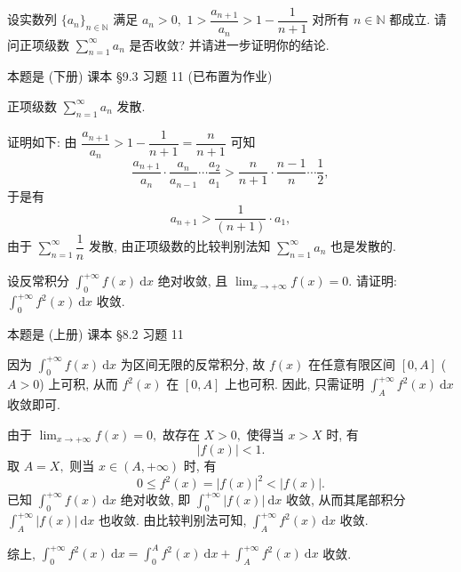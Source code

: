 \begin{question}[points = 10]
设实数列 $\{a_n\}_{n\in\mathbb{N}}$ 满足 $a_n > 0,$ $1 > \dfrac{a_{n+1}}{a_n} > 1 - \dfrac{1}{n+1}$ 对所有 $n \in \mathbb{N}$ 都成立. 请问正项级数 $\displaystyle \sum_{n=1}^{\infty} a_n$ 是否收敛? 并请进一步证明你的结论.

\end{question}

\begin{solution}
本题是 (下册) 课本 \S 9.3 习题 11 (已布置为作业)

正项级数 $\displaystyle \sum_{n=1}^{\infty} a_n$ 发散.

证明如下: 由 $\dfrac{a_{n+1}}{a_n} > 1 - \dfrac{1}{n+1} = \dfrac{n}{n+1}$ 可知
\begin{equation*}
\dfrac{a_{n+1}}{a_n} \cdot \dfrac{a_n}{a_{n-1}} \cdots \dfrac{a_2}{a_1} > \dfrac{n}{n+1} \cdot \dfrac{n-1}{n} \cdots \dfrac{1}{2},
\end{equation*}
于是有
\begin{equation*}
a_{n+1} > \dfrac{1}{(n+1)} \cdot a_1,
\end{equation*}
由于 $\displaystyle \sum_{n=1}^{\infty} \dfrac{1}{n}$ 发散, 由正项级数的比较判别法知 $\displaystyle \sum_{n=1}^{\infty} a_n$ 也是发散的.
\end{solution}

\begin{question}[points = 10]
设反常积分 $\displaystyle \int_0^{+\infty} f(x) ~ \mathrm{d} x$ 绝对收敛, 且 $\displaystyle \lim_{x \to +\infty} f(x) = 0.$ 请证明: $\displaystyle \int_0^{+\infty} f^2(x) ~ \mathrm{d} x$ 收敛.

\end{question}

\begin{solution}
本题是 (上册) 课本 \S 8.2 习题 11

因为 $\displaystyle \int_0^{+\infty} f(x) ~ \mathrm{d} x$ 为区间无限的反常积分, 故 $f(x)$ 在任意有限区间 $[0, A]$ ($A > 0$) 上可积, 从而 $f^2(x)$ 在 $[0, A]$ 上也可积. 因此, 只需证明 $\displaystyle \int_A^{+\infty} f^2(x) ~ \mathrm{d} x$ 收敛即可.

由于 $\displaystyle \lim_{x \to +\infty} f(x) = 0,$ 故存在 $X > 0,$ 使得当 $x > X$ 时, 有
\begin{equation*}
|f(x)| < 1.
\end{equation*}
取 $A = X,$ 则当 $x \in (A, +\infty)$ 时, 有
\begin{equation*}
0 \leqslant f^2(x) = |f(x)|^2 < |f(x)|.
\end{equation*}
已知 $\displaystyle \int_0^{+\infty} f(x) ~ \mathrm{d} x$ 绝对收敛, 即 $\displaystyle \int_0^{+\infty} |f(x)| ~ \mathrm{d} x$ 收敛, 从而其尾部积分 $\displaystyle \int_A^{+\infty} |f(x)| ~ \mathrm{d} x$ 也收敛. 由比较判别法可知, $\displaystyle \int_A^{+\infty} f^2(x) ~ \mathrm{d} x$ 收敛.

综上, $\displaystyle \int_0^{+\infty} f^2(x) ~ \mathrm{d} x = \int_0^A f^2(x) ~ \mathrm{d} x + \int_A^{+\infty} f^2(x) ~ \mathrm{d} x$ 收敛.
\end{solution}


